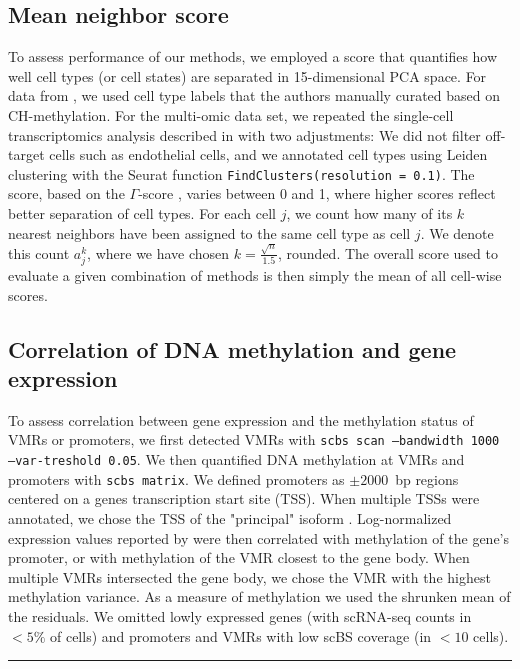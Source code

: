 \documentclass[twocolumn,10pt]{article}
\begin{document}
\subsection{Mean neighbor score} \label{methods:score}
To assess performance of our methods, we employed a score that quantifies how well cell types (or cell states) are separated in 15-dimensional PCA space.
For data from \citet{luo2017single}, we used cell type labels that the authors manually curated based on CH-methylation.
For the multi-omic data set, we repeated the single-cell transcriptomics analysis described in \citet{kremer_scnmt} with two adjustments:
We did not filter off-target cells such as endothelial cells, and we annotated cell types using Leiden clustering with the Seurat \citep{seurat} function \texttt{FindClusters(resolution = 0.1)}.
The score, based on the $\Gamma$-score \citep{Kireeva_2014}, varies between 0 and 1, where higher scores reflect better separation of cell types.
For each cell $j$, we count how many of its $k$ nearest neighbors have been assigned to the same cell type as cell $j$.
We denote this count $a^k_j$, where we have chosen $k=\frac{\sqrt{n}}{1.5}$, rounded.
The overall score used to evaluate a given combination of methods is then simply the mean of all cell-wise scores.

\subsection{Correlation of DNA methylation and gene expression}
To assess correlation between gene expression and the methylation status of VMRs or promoters, we
first detected VMRs with \texttt{scbs scan --bandwidth 1000 --var-treshold 0.05}.
We then quantified DNA methylation at VMRs and promoters with \texttt{scbs matrix}.
We defined promoters as $\pm2000$~bp regions centered on a genes transcription start site (TSS).
When multiple TSSs were annotated, we chose the TSS of the "principal" isoform \citep{appris}.
Log-normalized expression values reported by \citet{kremer_scnmt} were then correlated with methylation of the gene's promoter, or with methylation of the VMR closest to the gene body.
When multiple VMRs intersected the gene body, we chose the VMR with the highest methylation variance.
As a measure of methylation we used the shrunken mean of the residuals.
We omitted lowly expressed genes (with scRNA-seq counts in $<5\%$ of cells) and promoters and VMRs with low scBS coverage (in $<10$ cells).




\vspace{1.4ex}
\noindent\hfil\rule{.6\columnwidth}{.2pt}\hfil
\end{document}
